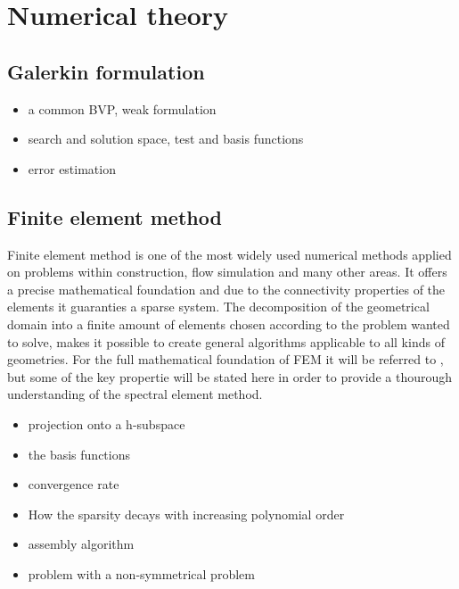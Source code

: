 
\chapter{Numerical theory} %

\label{theory} %



\section{Galerkin formulation}
\begin{itemize}
\item a common BVP, weak formulation 
\item search and solution space, test and basis functions
\item error estimation
\end{itemize}
\section{Finite element method}

Finite element method is one of the most widely used numerical methods applied on problems within construction, flow simulation and many 
other areas. It offers a precise mathematical foundation and due to the connectivity properties of the elements 
it guaranties a sparse system. The decomposition of the geometrical domain into a finite amount of elements chosen according to the problem 
wanted to solve, makes it possible to create general algorithms applicable to all kinds of geometries. 
For the full mathematical foundation of FEM it will be referred to \cite{Quarteroni}, but some of the key propertie will be stated here
in order to provide a thourough understanding of the spectral element method. 
\begin{itemize}
\item projection onto a h-subspace
\item the basis functions
\item convergence rate
\item How the sparsity decays with increasing polynomial order
\item assembly algorithm
\item problem with a non-symmetrical problem
\end{itemize}

